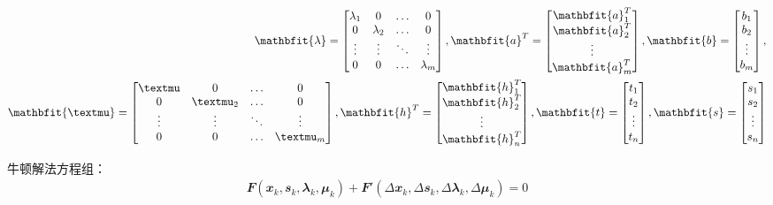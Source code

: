 \begin{align}
  \mathbfit{\lambda}=\begin{bmatrix}
    \lambda_1 & 0 & \dots & 0\\
    0 & \lambda_2 & \dots & 0\\
    \vdots & \vdots &\ddots & \vdots\\
    0 & 0 &\dots & \lambda_m
  \end{bmatrix}, \quad
  \mathbfit{a}^T=\begin{bmatrix}
    \mathbfit{a}_1^T \\ \mathbfit{a}_2^T \\ \vdots \\ \mathbfit{a}_m^T
  \end{bmatrix}, \quad
  \mathbfit{b}=\begin{bmatrix}
    b_1 \\ b_2 \\ \vdots \\ b_m 
  \end{bmatrix}, \quad \notag\\
  \mathbfit{\mu}=\begin{bmatrix}
    \mu & 0 & \dots & 0\\
    0 & \mu_2 & \dots & 0\\
    \vdots & \vdots &\ddots & \vdots\\
    0 & 0 &\dots & \mu_m
  \end{bmatrix}, \quad
  \mathbfit{h}^T=\begin{bmatrix}
    \mathbfit{h}_1^T \\ \mathbfit{h}_2^T \\ \vdots \\ \mathbfit{h}_n^T
  \end{bmatrix}, \quad
  \mathbfit{t}=\begin{bmatrix}
    t_1 \\ t_2 \\ \vdots \\ t_n
  \end{bmatrix}, \quad
  \mathbfit{s}=\begin{bmatrix}
    s_1 \\ s_2 \\ \vdots \\ s_n
  \end{bmatrix}
\end{align}

牛顿解法方程组：
\begin{align}
  \mathbfit{F}(\mathbfit{x}_k,\mathbfit{s}_k,\mathbfit{\lambda}_k,\mathbfit{\mu}_k)+\mathbfit{F}'(\Delta\mathbfit{x}_k,\Delta\mathbfit{s}_k,\Delta\mathbfit{\lambda}_k,\Delta\mathbfit{\mu}_k)=0
\end{align}

